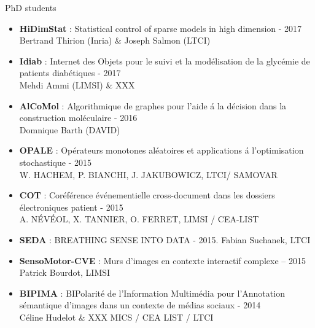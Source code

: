 \begin{frame}{PhD students}

\begin{itemize}
\item 
\small
\textbf{HiDimStat} : Statistical control of sparse models in high dimension - 2017
\\
Bertrand Thirion (Inria) \& Joseph Salmon (LTCI)
\item
\textbf{Idiab} : Internet des Objets pour le suivi et la mod\'elisation de la glyc\'emie de patients
diab\'etiques - 2017
\\
Mehdi Ammi (LIMSI) \& XXX
\item
\textbf{AlCoMol} : Algorithmique de graphes pour l'aide \'a la d\'ecision dans la construction
mol\'eculaire - 2016
\\
Domnique Barth (DAVID)
\item 
\textbf{OPALE} : Op\'erateurs monotones al\'eatoires et applications \'a l'optimisation stochastique -
2015
\\
W. HACHEM, P. BIANCHI, J. JAKUBOWICZ, LTCI/ SAMOVAR
\item 
\textbf{COT} : Cor\'ef\'erence \'ev\'enementielle cross-document dans les dossiers \'electroniques
patient - 2015
\\
A. N\'EV\'EOL, X. TANNIER, O. FERRET, LIMSI / CEA-LIST
\item 
\textbf{SEDA} : BREATHING SENSE INTO DATA - 2015. Fabian Suchanek, LTCI
\item 
\textbf{SensoMotor-CVE} : Murs d'images en contexte interactif complexe – 2015
\\
Patrick Bourdot, LIMSI
\item
\textbf{BIPIMA} : BIPolarit\'e de l'Information Multim\'edia pour l'Annotation s\'emantique d'images
dans un contexte de m\'edias sociaux - 2014
\\
C\'eline Hudelot \& XXX  MICS / CEA LIST / LTCI
\end{itemize}
\end{frame}

